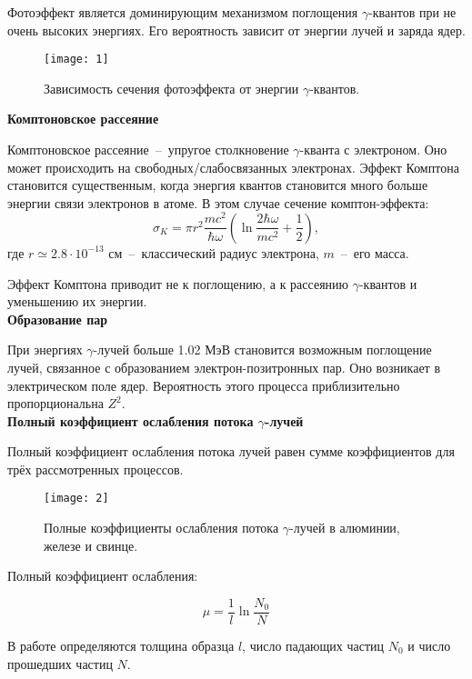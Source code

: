 \documentclass{lab}
\begin{document}
	Фотоэффект является доминирующим механизмом поглощения $\gamma$-квантов при не очень 
	высоких энергиях. Его вероятность зависит от энергии лучей и заряда  ядер.
	\begin{figure}[H]
		\centering
		\texttt{[image: 1]}
		\caption{Зависимость сечения фотоэффекта от энергии $\gamma$-квантов.}
	\end{figure}

	\textbf{Комптоновское рассеяние}
	
	Комптоновское рассеяние~--~упругое столкновение $\gamma$-кванта с электроном. Оно может 
	происходить на свободных/слабосвязанных электронах. Эффект Комптона становится 
	существенным, когда энергия квантов становится много больше энергии связи электронов в 
	атоме. В этом случае сечение комптон-эффекта:
	\begin{equation}
	 \sigma_K=\pi r^2 \dfrac{mc^2}{\hbar \omega}\left(\ln\frac{2\hbar\omega}{mc^2}+\frac{1}{2}\right),
	\end{equation}
	где $r\simeq 2.8 \cdot 10^{-13}$ см~--~классический радиус электрона, $m$~--~его масса.
	
	Эффект Комптона приводит не к поглощению, а к рассеянию $\gamma$-квантов и уменьшению их энергии.\\
	
	\textbf{Образование пар}
	
	При энергиях $\gamma$-лучей больше 1.02 МэВ становится возможным поглощение лучей, 
	связанное с образованием электрон-позитронных пар. Оно возникает в электрическом поле 
	ядер. Вероятность этого процесса приблизительно пропорциональна $Z^2$.\\
	
	\textbf{Полный коэффициент ослабления потока $\gamma$-лучей}
	
	Полный коэффициент ослабления потока лучей равен сумме коэффициентов для трёх 
	рассмотренных процессов. 
	
	\begin{figure}[H]
		\centering
		\texttt{[image: 2]}
		\caption{Полные коэффициенты ослабления потока $\gamma$-лучей в алюминии, железе и свинце.}
	\end{figure}
	
	Полный коэффициент ослабления:
	
	\begin{equation}
	\mu=\frac{1}{l}\ln\frac{N_0}{N}
	\end{equation}
	
	В работе определяются толщина образца $l$, число падающих частиц $N_0$ и число прошедших частиц $N$.
	
\end{document}

